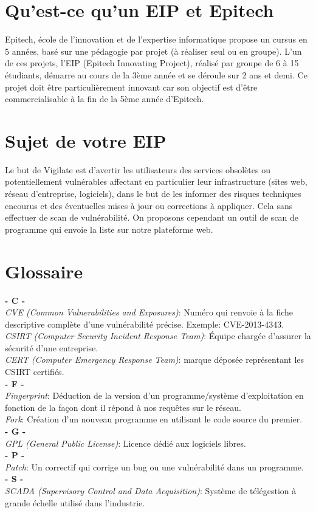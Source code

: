 \section{Qu'est-ce qu’un EIP et Epitech}
Epitech,  école de l'innovation et de l'expertise informatique propose un cursus en 5 années, basé sur une pédagogie par projet (à réaliser seul ou en groupe).  L'un de ces projets, l’EIP (Epitech Innovating Project), réalisé par groupe de 6 à 15 étudiants, démarre au cours de la 3ème année et se déroule sur 2 ans et demi. Ce  projet doit être particulièrement innovant car son objectif est d’être commercialisable à la fin de la 5ème année d’Epitech.

\section{Sujet de votre EIP}
Le but de Vigilate est d’avertir les utilisateurs des services obsolètes ou potentiellement vulnérables affectant en particulier leur infrastructure (sites web, réseau d'entreprise, logiciels), dans le but de les informer des risques techniques encourus et des éventuelles mises à jour ou corrections à appliquer.
Cela sans effectuer de scan de vulnérabilité.
On proposons cependant un outil de scan de programme qui envoie la liste sur notre plateforme web.

\section{Glossaire}
\noindent
\vskip 0.1cm
\textbf{- C -}\\
\textit{CVE (Common Vulnerabilities and Exposures)}: Numéro qui renvoie à la fiche descriptive complète d'une vulnérabilité précise. Exemple: CVE-2013-4343.\\
\textit{CSIRT (Computer Security Incident Response Team)}: Équipe chargée d'assurer la sécurité d'une entreprise.\\
\textit{CERT (Computer Emergency Response Team)}: marque déposée représentant les CSIRT certifiés.\\
\vskip 0.1cm
\textbf{- F -}\\
\textit{Fingerprint}: Déduction de la version d'un programme/système d'exploitation en fonction de la façon dont il répond à nos requêtes sur le réseau.\\
\textit{Fork}: Création d'un nouveau programme en utilisant le code source du premier.\\
\vskip 0.1cm
\textbf{- G -}\\
\textit{GPL (General Public License)}: Licence dédié aux logiciels libres.\\
\vskip 0.1cm
\textbf{- P -}\\
\textit{Patch}: Un correctif qui corrige un bug ou une vulnérabilité dans un programme.\\
\vskip 0.1cm
\textbf{- S -}\\
\textit{SCADA (Supervisory Control and Data Acquisition)}: Système de télégestion à grande échelle utilisé dans l'industrie.\\

